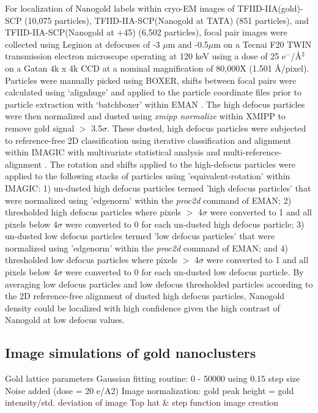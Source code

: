 For localization of Nanogold labels within cryo-EM images of TFIID-IIA(gold)-SCP (10,075 particles), TFIID-IIA-SCP(Nanogold at TATA) (851 particles), and TFIID-IIA-SCP(Nanogold at +45) (6,502 particles), focal pair images were collected using Leginon \cite{Suloway_1311} at defocuses of -3 $\mu$m and -0.5$\mu$m on a Tecnai F20 TWIN transmission electron microscope operating at 120 keV using a dose of 25 e$^{-}$/\AA$^{2}$ on a Gatan 4k x 4k CCD at a nominal magnification of 80,000X (1.501 \AA/pixel).  Particles were manually picked using BOXER, shifts between focal pairs were calculated using ‘alignhuge’ and applied to the particle coordinate files prior to particle extraction with ‘batchboxer’ within EMAN \cite{Ludtke_2307}.  The high defocus particles were then normalized and dusted using \emph{xmipp normalize} within XMIPP \cite{Sorzano_1492} to remove gold signal $>$ 3.5$\sigma$. These dusted, high defocus particles were subjected to reference-free 2D classification using iterative classification and alignment within IMAGIC with multivariate statistical analysis and multi-reference-alignment \cite{va_2849}. The rotation and shifts applied to the high-defocus particles were applied to the following stacks of particles using 'equivalent-rotation' within IMAGIC:  1) un-dusted high defocus particles termed 'high defocus particles' that were normalized using 'edgenorm' within the \emph{proc2d} command of EMAN; 2) thresholded high defocus particles where pixels $>$ 4$\sigma$ were converted to 1 and all pixels below 4$\sigma$ were converted to 0 for each un-dusted high defocus particle; 3) un-dusted low defocus particles termed 'low defocus particles' that were normalized using 'edgenorm' within the \emph{proc2d} command of EMAN; and 4) thresholded low defocus particles where pixels $>$ 4$\sigma$ were converted to 1 and all pixels below 4$\sigma$ were converted to 0 for each un-dusted low defocus particle.  By averaging low defocus particles and low defocus thresholded particles according to the 2D reference-free alignment of dusted high defocus particles, Nanogold density could be localized with high confidence given the high contrast of Nanogold at low defocus values.

\subsection{Image simulations of gold nanoclusters}

Gold lattice parameters
Gaussian fitting routine: 0 - 50000 using 0.15 step size
Noise added (dose = 20 e/A2)
Image normalization: gold peak height = gold intensity/std. deviation of image
Top hat & step function image creation

